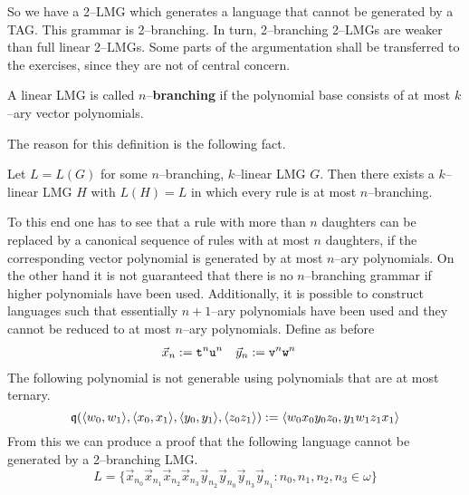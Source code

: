 So we have a 2--LMG which generates a language that cannot be
generated by a TAG. This grammar is 2--branching. In turn, 
2--branching 2--LMGs are weaker than full linear 2--LMGs. 
Some parts of the argumentation shall be transferred
to the exercises, since they are not of central concern.
\begin{defn}
A linear LMG is called $n$--\textbf{branching} if the polynomial
base consists of at most $k$--ary vector polynomials.
\end{defn}
The reason for this definition is the following fact.
\begin{prop}
\label{prop:nverzweig}
Let $L = L(G)$ for some $n$--branching, $k$--linear
LMG $G$. Then there exists a $k$--linear LMG $H$ with $L(H) = L$
in which every rule is at most $n$--branching.
\end{prop}
To this end one has to see that a rule with more than $n$ daughters
can be replaced by a canonical sequence of rules with at most
$n$ daughters, if the corresponding vector polynomial is generated
by at most $n$--ary polynomials. On the other hand it is not
guaranteed that there is no $n$--branching grammar if higher
polynomials have been used. Additionally, it is possible to construct
languages such that essentially $n+1$--ary polynomials have been
used and they cannot be reduced to at most $n$--ary polynomials.
Define as before
\begin{align}
\vec{x}_n & := \mbox{\tt t}^n\mbox{\tt u}^n &
\vec{y}_n & := \mbox{\tt v}^n\mbox{\tt w}^n
\end{align}
The following polynomial is not generable using polynomials that
are at most ternary.
\begin{equation}
\mathfrak{q}(\langle w_0,w_1\rangle,\langle x_0,x_1 \rangle, \langle y_0,y_1\rangle,
\langle z_0z_1\rangle) 
:= \langle w_0x_0y_0z_0, y_1w_1z_1x_1\rangle
\end{equation}
From this we can produce a proof that the following language
cannot be generated by a 2--branching LMG.
\begin{equation}
L = \{\vec{x}_{n_0}\vec{x}_{n_1}\vec{x}_{n_2}\vec{x}_{n_3}%
\vec{y}_{n_2}\vec{y}_{n_0}\vec{y}_{n_3}\vec{y}_{n_1} :
n_0, n_1, n_2, n_3 \in \omega\}
\end{equation}

